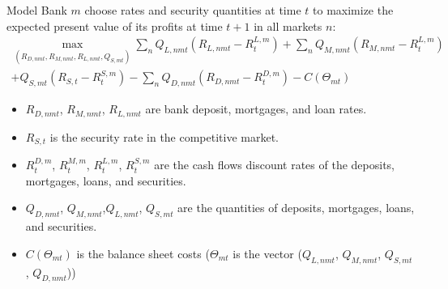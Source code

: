 \documentclass[notes,11pt, aspectratio=169]{beamer}
\begin{document}
\begin{frame}{Model}
    \vspace{0.3cm}
    Bank $m$ choose rates and security quantities at time $t$ to maximize the expected present value of its profits at time $t+1$ in all markets $n$:
    \begin{equation}
        \begin{gathered}
        \max _{\left(R_{D, n m t}, R_{M, n m t}, R_{L, n m t}, Q_{S, m t}\right)} \sum_n Q_{L, n m t}\left(R_{L, n m t}-R_t^{L, m}\right)+\sum_n Q_{M, n m t}\left(R_{M, n m t}-R_t^{L, m}\right) \\
        +Q_{S, m t}\left(R_{S, t}-R_t^{S, m}\right)-\sum_n Q_{D, n m t}\left(R_{D, n m t}-R_t^{D, m}\right)-C\left(\Theta_{m t}\right)
        \end{gathered}
        \end{equation}
        \vspace{0.1cm}
        \begin{itemize}
            \item $R_{D,nmt}$, $R_{M,nmt}$, $R_{L,nmt}$ are bank deposit, mortgages, and loan rates.
            \item $R_{S,t}$ is the security rate in the competitive market. 
            \item $R^{D,m}_t$, $R^{M,m}_t$, $R^{L,m}_t$, $R^{S,m}_t$ are the cash flows discount rates of the deposits, mortgages, loans, and securities.
            \item $Q_{D, n m t}$,  $Q_{M, n m t}$,$Q_{L, n m t}$, $Q_{S, m t}$ are the quantities of deposits, mortgages, loans, and securities.
            \item $C(\Theta_{mt})$ is the balance sheet costs ($\Theta_{mt}$ is the vector ($Q_{L, n m t}$, $Q_{M, n m t}$, $Q_{S, m t}$, $Q_{D, n m t}$))
    
            
        \end{itemize}
    \end{frame}
    
\end{document}
